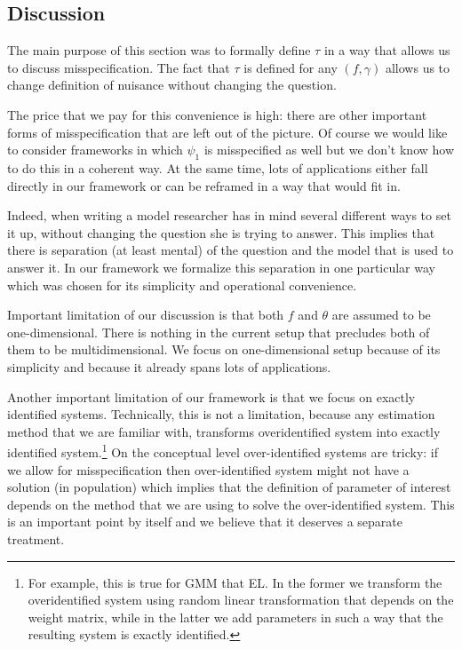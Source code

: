 \documentclass[12pt]{article}
\theoremstyle{plain}
\begin{document}
\subsection{Discussion}
The main purpose of this section was to formally define $\tau$ in a way that allows us to discuss misspecification. The fact that $\tau$ is defined for any $(f,\gamma)$ allows us to change definition of nuisance without changing the question. 

The price that we pay for this convenience is high: there are other important forms of misspecification that are left out of the picture. Of course we would like to consider frameworks in which $\psi_1$ is misspecified as well but we don't know how to do this in a coherent way. At the same time, lots of applications either fall directly in our framework or can be reframed in a way that would fit in.

Indeed, when writing a model researcher has in mind several different ways to set it up, without changing the question she is trying to answer. This implies that there is  separation (at least mental) of the question and the model that is used to answer it. In our framework we formalize this separation in one particular way which was chosen for its simplicity and operational convenience. 

Important limitation of our discussion is that both $f$ and $\theta$ are assumed to be one-dimensional. There is nothing in the current setup that precludes both of them to be multidimensional. We focus on one-dimensional setup because of its simplicity and because it already spans lots of applications.

Another important limitation of our framework is that we focus on exactly identified systems. Technically, this is not a limitation, because any estimation method that we are familiar with, transforms overidentified system into exactly identified system.\footnote{For example, this is true for GMM that EL. In the former we transform the overidentified system using random linear transformation that depends on the weight matrix, while in the latter we add parameters in such a way that the resulting system is exactly identified.} On the conceptual level over-identified systems are tricky: if we allow for misspecification then over-identified system might not have a solution (in population) which implies that the definition of parameter of interest depends on the method that we are using to solve the over-identified system. This is an important point by itself and we believe that it deserves a separate treatment. 
\end{document}
